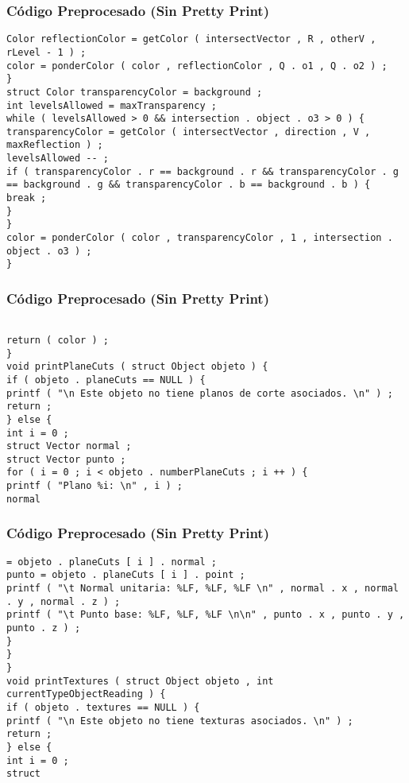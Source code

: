 \documentclass{beamer}
\begin{document}
\begin{frame}[fragile]
\frametitle{C\'odigo Preprocesado (Sin Pretty Print)}
\begin{lstlisting}[style=CStyle]
Color reflectionColor = getColor ( intersectVector , R , otherV , rLevel - 1 ) ; 
color = ponderColor ( color , reflectionColor , Q . o1 , Q . o2 ) ; 
} 
struct Color transparencyColor = background ; 
int levelsAllowed = maxTransparency ; 
while ( levelsAllowed > 0 && intersection . object . o3 > 0 ) { 
transparencyColor = getColor ( intersectVector , direction , V , maxReflection ) ; 
levelsAllowed -- ; 
if ( transparencyColor . r == background . r && transparencyColor . g == background . g && transparencyColor . b == background . b ) { 
break ; 
} 
} 
color = ponderColor ( color , transparencyColor , 1 , intersection . object . o3 ) ; 
} \end{lstlisting}
\end{frame}
\begin{frame}[fragile]
\frametitle{C\'odigo Preprocesado (Sin Pretty Print)}
\begin{lstlisting}[style=CStyle]

return ( color ) ; 
} 
void printPlaneCuts ( struct Object objeto ) { 
if ( objeto . planeCuts == NULL ) { 
printf ( "\n Este objeto no tiene planos de corte asociados. \n" ) ; 
return ; 
} else { 
int i = 0 ; 
struct Vector normal ; 
struct Vector punto ; 
for ( i = 0 ; i < objeto . numberPlaneCuts ; i ++ ) { 
printf ( "Plano %i: \n" , i ) ; 
normal \end{lstlisting}
\end{frame}
\begin{frame}[fragile]
\frametitle{C\'odigo Preprocesado (Sin Pretty Print)}
\begin{lstlisting}[style=CStyle]
= objeto . planeCuts [ i ] . normal ; 
punto = objeto . planeCuts [ i ] . point ; 
printf ( "\t Normal unitaria: %LF, %LF, %LF \n" , normal . x , normal . y , normal . z ) ; 
printf ( "\t Punto base: %LF, %LF, %LF \n\n" , punto . x , punto . y , punto . z ) ; 
} 
} 
} 
void printTextures ( struct Object objeto , int currentTypeObjectReading ) { 
if ( objeto . textures == NULL ) { 
printf ( "\n Este objeto no tiene texturas asociados. \n" ) ; 
return ; 
} else { 
int i = 0 ; 
struct \end{lstlisting}
\end{frame}
\end{document}
